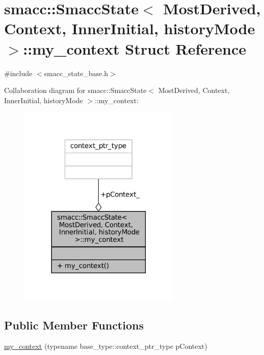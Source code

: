 \hypertarget{structsmacc_1_1SmaccState_1_1my__context}{}\section{smacc\+:\+:Smacc\+State$<$ Most\+Derived, Context, Inner\+Initial, history\+Mode $>$\+:\+:my\+\_\+context Struct Reference}
\label{structsmacc_1_1SmaccState_1_1my__context}


{\ttfamily \#include $<$smacc\+\_\+state\+\_\+base.\+h$>$}



Collaboration diagram for smacc\+:\+:Smacc\+State$<$ Most\+Derived, Context, Inner\+Initial, history\+Mode $>$\+:\+:my\+\_\+context\+:
\nopagebreak
\begin{figure}[H]
\begin{center}
\leavevmode
\includegraphics[width=218pt]{structsmacc_1_1SmaccState_1_1my__context__coll__graph}
\end{center}
\end{figure}
\subsection*{Public Member Functions}
\begin{DoxyCompactItemize}
\item 
\hyperlink{structsmacc_1_1SmaccState_1_1my__context_af9c11c27b17bbf7de0d4e21c87d49f6f}{my\+\_\+context} (typename base\+\_\+type\+::context\+\_\+ptr\+\_\+type p\+Context)
\end{DoxyCompactItemize}
